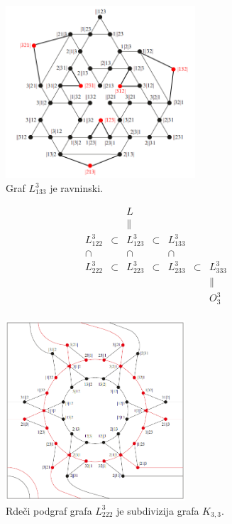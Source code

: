 \documentclass[dvipsnames]{beamer}
\begin{document}
\begin{frame}
    \begin{figure}[h]
        \includegraphics[width=200pt]{../img/graph-L^3_133.png}
        \caption{Graf $L^3_{133}$ je ravninski.}
        \label{fig:L^3_133}
    \end{figure}
\end{frame}

\begin{frame}
    \begin{equation*}
        \label{eq:grafi-3krogle}
        \begin{matrix}
            & & L & & & & \\
            & & \parallel & & & & \\
            L_{122}^3 & \subset & L_{123}^3 & \subset & L_{133}^3 & & \\
            \cap & & \cap & & \cap & & \\
            L_{222}^3 & \subset & L_{223}^3 & \subset & L_{233}^3 & \subset & L_{333}^3 \\
            & & & & & & \parallel \\
            & & & & & & O^3_3 \\
        \end{matrix}
    \end{equation*}
\end{frame}

\begin{frame}
    \begin{figure}[h]
        \includegraphics[width=190pt]{../img/tolgraph-O^3_222-subdivision.png}
        \caption{Rdeči podgraf grafa $L_{222}^3$ je subdivizija grafa $K_{3,3}$.}
    \end{figure}
\end{frame}
\end{document}
